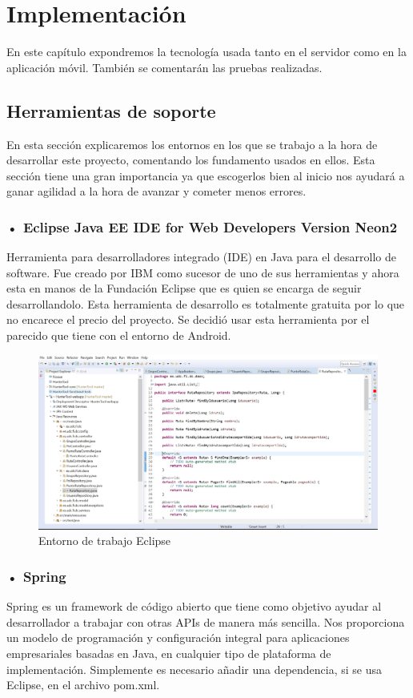
\section{Implementación}
En este capítulo expondremos la tecnología usada tanto en el servidor como en la aplicación móvil. También se comentarán las pruebas realizadas.


\subsection{Herramientas de soporte}
En esta sección explicaremos los entornos en los que se trabajo a la hora de desarrollar este proyecto, comentando los fundamento usados en ellos. Esta sección tiene una gran importancia ya que escogerlos bien al inicio nos ayudará a ganar agilidad a la hora de avanzar y cometer menos errores.


\subsubsection{• Eclipse Java EE IDE for Web Developers Version Neon2 }
Herramienta para desarrolladores  integrado (IDE)  en Java para el desarrollo de software. Fue creado por IBM como sucesor de uno de sus herramientas y ahora esta en manos de la Fundación Eclipse que es quien se encarga de seguir desarrollandolo.
 Esta herramienta de desarrollo es totalmente gratuita por lo que no encarece el precio del proyecto. Se decidió usar esta herramienta por el parecido que tiene con el entorno de Android.
\begin{figure}[H]
		\centering
		\includegraphics[width=1\textwidth] {eclipse.png}
		\caption{Entorno de trabajo Eclipse }
	\end{figure}
\subsubsection{• Spring}
Spring es un framework de código abierto que tiene como objetivo ayudar al desarrollador a trabajar con otras APIs de manera más sencilla. Nos proporciona un modelo de programación y configuración integral para aplicaciones empresariales basadas en Java, en cualquier tipo de plataforma de implementación. Simplemente es necesario añadir una dependencia, si se usa Eclipse, en el archivo pom.xml. 

